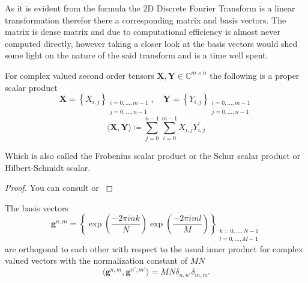 As it is evident from the formula the $2$D Discrete Fourier Transform is a linear transformation therefor 
there a corresponding matrix and basis vectors. The matrix is dense matrix and due to computational efficiency 
is almost never computed directly, however taking a closer look at the basis vectors would shed some light on 
the nature of the said transform and is a time well spent.



\begin{Prop}
    For complex valued second order tensors $\boldsymbol{X},\boldsymbol{Y} \in \mathbb{C}^{m \times n}$ the following is a proper scalar product
    \begin{equation*}
        \boldsymbol{X} = \left\{X_{i,j}\right\}_{\substack{i=0,\ldots,m-1\\ j=0,\ldots,n-1}}, \quad \boldsymbol{Y} = \left\{Y_{i,j}\right\}_{\substack{i=0,\ldots,m-1\\ j=0,\ldots,n-1}}
    \end{equation*}
    \begin{equation*}
        \langle\boldsymbol{X},\boldsymbol{Y}\rangle \coloneqq \sum_{j=0}^{n-1}\sum_{i=0}^{m-1} X_{i,j} \overline{Y_{i,j}} 
    \end{equation*}
\end{Prop}

Which is also called the Frobenius scalar product or the Schur scalar product or 
Hilbert-Schmidt scalar.

\begin{proof}
    You can consult \cite{Frazier1999} or \cite{Horn2012} \cite{Hackbusch2019}
\end{proof}

\begin{Prop}\label{Prop:2ddftbasisvectors}
    The basis vectors
    \begin{equation}\label{eq:2ddftbasisvectors}
        \boldsymbol{g}^{n,m} = \left\{\exp\left({\frac{-2\pi ink}{N}}\right)\exp\left({\frac{-2\pi iml}{M}}\right)\right\}_{\substack{k=0,\ldots,N-1\\l=0,\ldots,M-1}}
    \end{equation}
    are orthogonal to each other with respect to the usual inner product for complex valued vectors 
    with the normalization constant of $MN$
    \begin{equation}
        \langle\boldsymbol{g}^{n,m},\boldsymbol{g}^{n',m'}\rangle= MN \delta_{n,n'}\delta_{m,m'}
    \end{equation}
\end{Prop}


